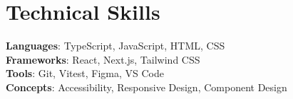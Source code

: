\documentclass[letterpaper,11pt]{article}
\begin{document}
\section{Technical Skills}
  \begin{itemize}[leftmargin=0.15in, label={}]
    \small{\item{
      \textbf{Languages}{: TypeScript, JavaScript, HTML, CSS} \\
      \textbf{Frameworks}{: React, Next.js, Tailwind CSS} \\
      \textbf{Tools}{: Git, Vitest, Figma, VS Code} \\
      \textbf{Concepts}{: Accessibility, Responsive Design, Component Design}
    }}
  \end{itemize}
\end{document}
